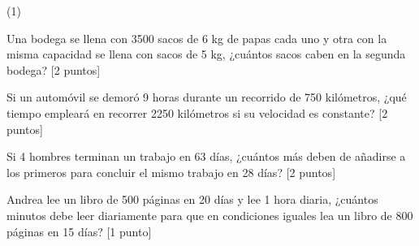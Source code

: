 \documentclass[sin curso]{plantilla-evaluacion-v1}
\begin{document}
\begin{preguntas}(1)

  \pregunta Una bodega se llena con 3500 sacos de 6 kg de papas cada uno y otra
  con la misma capacidad se llena con sacos de 5 kg, ¿cuántos sacos caben en la
  segunda bodega? [2 puntos]
  \begin{malla}[height=8cm]
  \end{malla}
  \begin{respuesta}[height=2cm]
  \end{respuesta}

  \pregunta Si un automóvil se demoró 9 horas durante un recorrido de 750 kilómetros,
  ¿qué tiempo empleará en recorrer 2250 kilómetros si su velocidad es constante?
  [2 puntos]
  \begin{malla}[height=8cm]
  \end{malla}
  \begin{respuesta}[height=2cm]
  \end{respuesta}

  \pregunta Si 4 hombres terminan un trabajo en 63 días, ¿cuántos más deben de
  añadirse a los primeros para concluir el mismo trabajo en 28 días?
  [2 puntos]
  \begin{malla}[height=8cm]
  \end{malla}
  \begin{respuesta}[height=2cm]
  \end{respuesta}

  \pregunta Andrea lee un libro de 500 páginas en 20 días y lee 1 hora diaria,
  ¿cuántos minutos debe leer diariamente para que en condiciones iguales lea un libro
  de 800 páginas en 15 días?
  [1 punto]
  \begin{malla}[height=8cm]
  \end{malla}
  \begin{respuesta}[height=2cm]
  \end{respuesta}

\end{preguntas}
\end{document}
